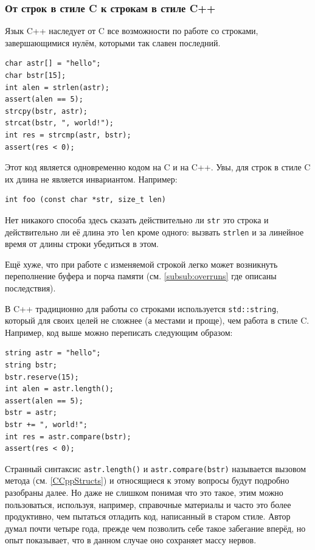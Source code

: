 \documentclass[a4paper,12pt,oneside]{article}
\begin{document}
\subsubsection{От строк в стиле C к строкам в стиле C++}\label{subsubsec:cstrings}

Язык C++ наследует от C все возможности по работе со строками, завершающимися нулём, которыми так славен последний.

\begin{lstlisting}
char astr[] = "hello";
char bstr[15];
int alen = strlen(astr);
assert(alen == 5);
strcpy(bstr, astr);
strcat(bstr, ", world!");
int res = strcmp(astr, bstr);
assert(res < 0);
\end{lstlisting}

Этот код является одновременно кодом на C и на C++. Увы, для строк в стиле C их длина не является инвариантом. Например:

\begin{lstlisting}
int foo (const char *str, size_t len)
\end{lstlisting}

Нет никакого способа здесь сказать действительно ли \lstinline!str! это строка и действительно ли её длина это \lstinline!len! кроме одного: вызвать \lstinline!strlen! и за линейное время от длины строки убедиться в этом.

Ещё хуже, что при работе с изменяемой строкой легко может возникнуть переполнение буфера и порча памяти (см. \ref{subsub:overruns} где описаны последствия).

В C++ традиционно для работы со строками используется \lstinline!std::string!, который для своих целей не сложнее (а местами и проще), чем работа в стиле C. Например, код выше можно переписать следующим образом:

\begin{lstlisting}
string astr = "hello";
string bstr; 
bstr.reserve(15);
int alen = astr.length();
assert(alen == 5);
bstr = astr;
bstr += ", world!";
int res = astr.compare(bstr);
assert(res < 0);
\end{lstlisting}

Странный синтаксис \lstinline!astr.length()! и \lstinline!astr.compare(bstr)! называется вызовом метода (см. \ref{CCppStructs}) и относящиеся к этому вопросы будут подробно разобраны далее. Но даже не слишком понимая что это такое, этим можно пользоваться, используя, например, справочные материалы и часто это более продуктивно, чем пытаться отладить код, написанный в старом стиле. Автор думал почти четыре года, прежде чем позволить себе такое забегание вперёд, но опыт показывает, что в данном случае оно сохраняет массу нервов.
\end{document}
